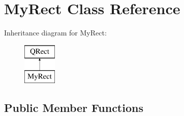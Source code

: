 \hypertarget{classMyRect}{}\section{My\+Rect Class Reference}
\label{classMyRect}
Inheritance diagram for My\+Rect\+:\begin{figure}[H]
\begin{center}
\leavevmode
\includegraphics[height=2.000000cm]{classMyRect}
\end{center}
\end{figure}
\subsection*{Public Member Functions}
